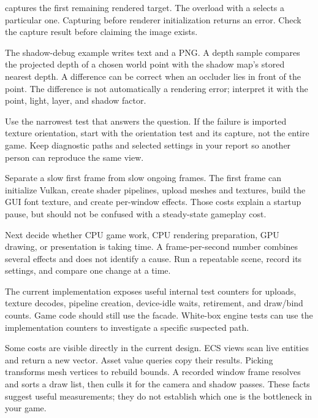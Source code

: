 \documentclass[11pt,a4paper]{article}
\begin{document}
 captures the first remaining rendered target. The overload with a  selects a particular one. Capturing before renderer initialization returns an error. Check the capture result before claiming the image exists.

The shadow-debug example writes text and a PNG. A depth sample compares the projected depth of a chosen world point with the shadow map's stored nearest depth. A difference can be correct when an occluder lies in front of the point. The difference is not automatically a rendering error; interpret it with the point, light, layer, and shadow factor.

Use the narrowest test that answers the question. If the failure is imported texture orientation, start with the orientation test and its capture, not the entire game. Keep diagnostic paths and selected settings in your report so another person can reproduce the same view.

Separate a slow first frame from slow ongoing frames. The first frame can initialize Vulkan, create shader pipelines, upload meshes and textures, build the GUI font texture, and create per-window effects. Those costs explain a startup pause, but should not be confused with a steady-state gameplay cost.

Next decide whether CPU game work, CPU rendering preparation, GPU drawing, or presentation is taking time. A frame-per-second number combines several effects and does not identify a cause. Run a repeatable scene, record its settings, and compare one change at a time.

The current implementation exposes useful internal test counters for uploads, texture decodes, pipeline creation, device-idle waits, retirement, and draw/bind counts. Game code should still use the facade. White-box engine tests can use the implementation counters to investigate a specific suspected path.

Some costs are visible directly in the current design. ECS views scan live entities and return a new vector. Asset value queries copy their results. Picking transforms mesh vertices to rebuild bounds. A recorded window frame resolves and sorts a draw list, then culls it for the camera and shadow passes. These facts suggest useful measurements; they do not establish which one is the bottleneck in your game.
\end{document}
